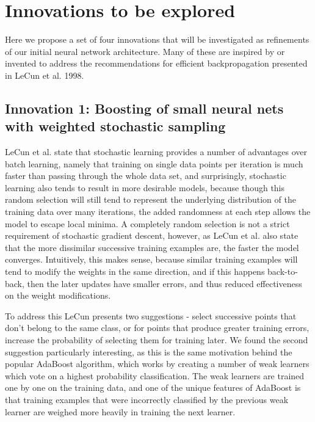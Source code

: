 \documentclass[12pt]{article}  %
\begin{document}
\section {Innovations to be explored}
\label {Innovations to be explored}
Here we propose a set of four innovations that will be investigated as refinements of our initial neural network architecture. Many of these are inspired by or invented to address the recommendations for efficient backpropagation presented in LeCun et al. 1998.

\subsection { Innovation 1: Boosting of small neural nets with weighted stochastic sampling}
\label { Innovation 1: Boosting of small neural nets with weighted stochastic sampling}
LeCun et al. state that stochastic learning provides a number of advantages over batch learning, namely that training on single data points per iteration is much faster than passing through the whole data set, and surprisingly, stochastic learning also tends to result in more desirable models, because though this random selection will still tend to represent the underlying distribution of the training data over many iterations, the added randomness at each step allows the model to escape local minima. A completely random selection is not a strict requirement of stochastic gradient descent, however, as LeCun et al. also state that the more dissimilar successive training examples are, the faster the model converges. Intuitively, this makes sense, because similar training examples will tend to modify the weights in the same direction, and if this happens back-to-back, then the later updates have smaller errors, and thus reduced effectiveness on the weight modifications. 

To address this LeCun presents two suggestions - select successive points that don't belong to the same class, or for points that produce greater training errors, increase the probability of selecting them for training later. We found the second suggestion particularly interesting, as this is the same motivation behind the popular AdaBoost algorithm, which works by creating a number of weak learners which vote on a highest probability classification. The weak learners are trained one by one on the training data, and one of the unique features of AdaBoost is that training examples that were incorrectly classified by the previous weak learner are weighed more heavily in training the next learner. 
\end{document}
